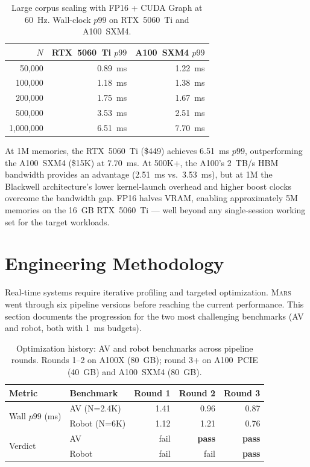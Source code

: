 \documentclass[11pt]{article}
\newcommand{\mars}{\textsc{Mars}}
\begin{document}
\begin{table}[ht]
\centering
\small
\caption{Large corpus scaling with FP16 + CUDA Graph at 60~Hz.
Wall-clock $p99$ on RTX~5060~Ti and A100~SXM4.}
\label{tab:large_scaling}
\begin{tabular}{rrr}
\toprule
\textbf{$N$} & \textbf{RTX~5060~Ti $p99$} & \textbf{A100~SXM4 $p99$} \\
\midrule
  50{,}000 & 0.89~ms & 1.22~ms \\
 100{,}000 & 1.18~ms & 1.38~ms \\
 200{,}000 & 1.75~ms & 1.67~ms \\
 500{,}000 & 3.53~ms & 2.51~ms \\
1{,}000{,}000 & 6.51~ms & 7.70~ms \\
\bottomrule
\end{tabular}
\end{table}

At 1M memories, the RTX~5060~Ti (\$449) achieves 6.51~ms $p99$,
outperforming the A100~SXM4 (\$15K) at 7.70~ms. At 500K+, the A100's
2~TB/s HBM bandwidth provides an advantage (2.51~ms vs.\ 3.53~ms), but
at 1M the Blackwell architecture's lower kernel-launch overhead and
higher boost clocks overcome the bandwidth gap. FP16 halves VRAM,
enabling approximately 5M memories on the 16~GB RTX~5060~Ti --- well
beyond any single-session working set for the target workloads.

\section{Engineering Methodology}
\label{sec:engineering}

Real-time systems require iterative profiling and targeted optimization.
\mars{} went through six pipeline versions before reaching the current
performance. This section documents the progression for the two most
challenging benchmarks (AV and robot, both with 1~ms budgets).

\begin{table}[ht]
\centering
\small
\caption{Optimization history: AV and robot benchmarks across pipeline
rounds. Rounds 1--2 on A100X (80~GB); round 3+ on A100~PCIE (40~GB) and
A100~SXM4 (80~GB).}
\label{tab:opt_history}
\begin{tabular}{llrrr}
\toprule
\textbf{Metric} & \textbf{Benchmark} & \textbf{Round 1} & \textbf{Round 2} & \textbf{Round 3} \\
\midrule
\multirow{2}{*}{Wall $p99$ (ms)}
  & AV (N=2.4K)   & 1.41 & 0.96 & 0.87 \\
  & Robot (N=6K)  & 1.12 & 1.21 & 0.76 \\
\midrule
\multirow{2}{*}{Verdict}
  & AV            & fail & \textbf{pass} & \textbf{pass} \\
  & Robot         & fail & fail & \textbf{pass} \\
\bottomrule
\end{tabular}
\end{table}
\end{document}
